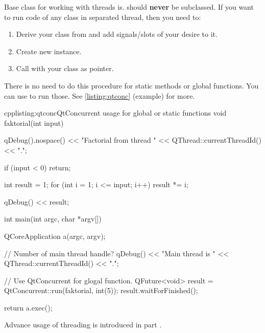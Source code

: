 Base class for working with threads is. \citep[QThread class]{various:qtdoc}   should \textbf{never} be subclassed. If you want to run code of any class in separated thread, then you need to:
\begin{enumerate}
\item Derive your class from and add signals/slots of your desire to it.
\item Create new instance.
\item Call with your class as pointer.
\end{enumerate}

There is no need to do this procedure for static methods or global functions. You can use to run those. \citep[QtConcurrent]{various:qtdoc} See \autoref{listing:qtconc} (example) for more.

\begin{fdoccode}{cpp}{listing:qtconc}{QtConcurrent usage for global or static functions}
void faktorial(int input) {
    qDebug().nospace() << "Factorial from thread " << QThread::currentThreadId() << ".";

    if (input < 0) {
		return;
    }

    int result = 1;
    for (int i = 1; i <= input; i++) {
		result *= i;
    }

    qDebug() << result;
}


int main(int argc, char *argv[]) {
    QCoreApplication a(argc, argv);

    // Number of main thread handle?
    qDebug() << "Main thread is " << QThread::currentThreadId() << ".";

    // Use QtConcurrent for glogal function.
    QFuture<void> result = QtConcurrent::run(faktorial, int(5));
    result.waitForFinished();

    return a.exec();
}
\end{fdoccode}

Advance usage of threading is introduced in part .